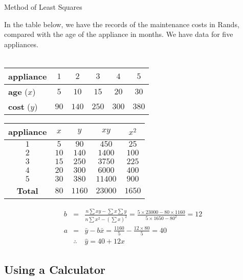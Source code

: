 \begin{wex}{Method of Least Squares}
{In the table below, we have the records of the maintenance costs in Rands, compared with the age of the appliance in months. We have data for five appliances.\\ \\
\begin{center}
\begin{tabular}{|l|c|c|c|c|c|}\hline
\textbf{appliance} & $1$ & $2$ & $3$ & $4$ & $5$ \\\hline
\textbf{age} ($x$) & $5$ & $10$ & $15$ & $20$ & $30$ \\\hline
\textbf{cost} ($y$)& $90$ & $140$ & $250$ & $300$ & $380$ \\\hline
\end{tabular}
\end{center}
}

{
\begin{center}
\begin{tabular}{|c|c|c|c|c|}\hline
\textbf{appliance}& $x$ & $y$ & $xy$ & $x^2$\\\hline
$1$ & $5$ & $90$ & $450$ & $25$ \\\hline
$2$ & $10$ & $140$ & $1400$ & $100$\\\hline
$3$ & $15$ & $250$ & $3750$ & $225$ \\\hline
$4$ & $20$ & $300$ & $6000$ & $400$\\\hline
$5$ & $30$ & $380$ & $11400$ & $900$ \\\hline
\textbf{Total} & $80$ & $1160$ & $23000$ & $1650$ \\\hline
\end{tabular}
\end{center}
\begin{eqnarray*}
b &=& \frac{n \sum{xy} - \sum{x}\sum{y}}{n\sum{x^2} - \left(\sum{x}\right)^2} = \frac{5\times 23000 - 80\times 1160}{5\times 1650 - 80^2} = 12\\
a &=& \bar{y} - b\bar{x} = \frac{1160}{5} - \frac{12\times 80}{5} = 40\\
&\therefore& \hat{y} = 40 + 12x
\end{eqnarray*}
}
\end{wex}

\subsection{Using a Calculator}

